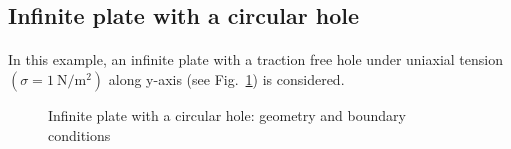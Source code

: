 



\subsection{Infinite plate with a circular hole}
\paragraph{}
In this example, an infinite plate with a traction free hole under uniaxial tension $(\sigma = \SI{1}{\newton \per \meter^2} ) $  along y-axis (see Fig.~\ref{adap_fig:ex_chole_geo_bc}) is considered.
\begin{figure}[h!]
    \centering
    \caption{Infinite plate with a circular hole: geometry and boundary conditions}
    \label{adap_fig:ex_chole_geo_bc}
\end{figure}

